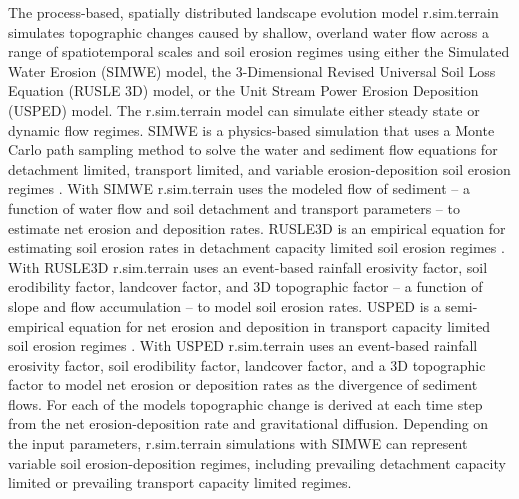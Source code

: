 \documentclass[gmd, manuscript]{copernicus}
\begin{document}
The process-based, spatially distributed 
landscape evolution model r.sim.terrain
simulates topographic changes
caused by shallow, overland water flow
across a range of spatiotemporal scales and soil erosion regimes
using either
the Simulated Water Erosion (SIMWE) model, 
the 3-Dimensional Revised Universal Soil Loss Equation (RUSLE 3D) model,
or the Unit Stream Power Erosion Deposition (USPED) model.  
The r.sim.terrain model
can simulate either steady state or dynamic flow regimes.
SIMWE is a physics-based simulation
that uses a Monte Carlo path sampling method
to solve the water and sediment flow equations
for detachment limited, transport limited, and variable erosion-deposition 
soil erosion regimes 
\citep{Mitas1998,Mitasova2004}. 
With SIMWE 
r.sim.terrain
uses the modeled flow of sediment 
-- a function of water flow and soil detachment and transport parameters -- 
to estimate net erosion and deposition rates. 
RUSLE3D is an empirical equation for estimating soil erosion rates
in detachment capacity limited soil erosion regimes 
\citep{Mitasova1996,Mitasova2013}. 
%
With RUSLE3D r.sim.terrain
uses an event-based rainfall erosivity factor, 
soil erodibility factor, landcover factor, and 3D topographic factor
-- a function of slope and flow accumulation --
to model soil erosion rates. 
USPED is a semi-empirical equation for net erosion and deposition 
in transport capacity limited soil erosion regimes 
\citep{Mitasova1996,Mitasova2013}. 
With USPED r.sim.terrain uses an event-based rainfall erosivity factor, 
soil erodibility factor, landcover factor, and a 3D topographic factor
to model net erosion or deposition rates as the divergence of sediment flows. 
For each of the models 
topographic change is derived at each time step
from the net erosion-deposition rate
and gravitational diffusion.
Depending on the input parameters, 
r.sim.terrain simulations with SIMWE 
can represent variable soil erosion-deposition regimes, 
including prevailing detachment capacity limited 
or prevailing transport capacity limited regimes.
\end{document}
